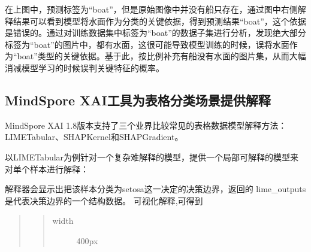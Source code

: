 \documentclass[letterpaper,10pt,english]{sphinxmanual}
\begin{document}
\sphinxAtStartPar
在上图中，预测标签为“boat”，但是原始图像中并没有船只存在，通过图中右侧解释结果可以看到模型将水面作为分类的关键依据，得到预测结果“boat”，这个依据是错误的。通过对训练数据集中标签为“boat”的数据子集进行分析，发现绝大部分标签为“boat”的图片中，都有水面，这很可能导致模型训练的时候，误将水面作为“boat”类型的关键依据。基于此，按比例补充有船没有水面的图片集，从而大幅消减模型学习的时候误判关键特征的概率。


\subsection{MindSpore XAI工具为表格分类场景提供解释}
\label{\detokenize{chapter_explainable_AI/explainable_ai:tabular-lime}}\label{\detokenize{chapter_explainable_AI/explainable_ai:id19}}
\sphinxAtStartPar
MindSpore XAI
1.8版本支持了三个业界比较常见的表格数据模型解释方法：LIMETabular、SHAPKernel和SHAPGradient。

\sphinxAtStartPar
以LIMETabular为例针对一个复杂难解释的模型，提供一个局部可解释的模型来对单个样本进行解释：

\begin{sphinxVerbatim}[commandchars=\\\{\}]
   

   

     

    
\end{sphinxVerbatim}

\sphinxAtStartPar
解释器会显示出把该样本分类为setosa这一决定的决策边界，返回的
lime\_outputs 是代表决策边界的一个结构数据。 可视化解释,可得到
\begin{center}\end{center}
\begin{quote}
\begin{quote}\begin{description}
\item[{width}] \leavevmode
\sphinxAtStartPar
400px

\end{description}\end{quote}
\end{quote}
\end{document}
